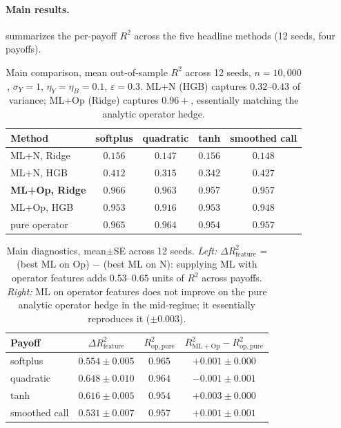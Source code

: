 \documentclass[11pt,reqno]{amsart}
\theoremstyle{plain}
\theoremstyle{definition}
\theoremstyle{remark}
\begin{document}
\paragraph{Main results.}
 summarizes the per-payoff $R^{2}$
across the five headline methods (12 seeds, four payoffs).

\begin{table}[ht]
\centering
\small
\begin{tabular}{lcccc}
\toprule
Method & softplus & quadratic & tanh & smoothed call \\
\midrule
ML+N, Ridge                & $0.156$ & $0.147$ & $0.156$ & $0.148$ \\
ML+N, HGB                  & $0.412$ & $0.315$ & $0.342$ & $0.427$ \\
\textbf{ML+Op, Ridge}      & $\mathbf{0.966}$ & $\mathbf{0.963}$ & $\mathbf{0.957}$ & $\mathbf{0.957}$ \\
ML+Op, HGB                 & $0.953$ & $0.916$ & $0.953$ & $0.948$ \\
pure operator              & $0.965$ & $0.964$ & $0.954$ & $0.957$ \\
\bottomrule
\end{tabular}
\caption{Main comparison, mean out-of-sample $R^{2}$ across 12
seeds, $n=10{,}000$, $\sigma_{Y}=1$, $\eta_{Y}=\eta_{B}=0.1$,
$\varepsilon=0.3$. ML+N (HGB) captures $0.32$--$0.43$ of
variance; ML+Op (Ridge) captures $0.96+$, essentially matching
the analytic operator hedge.}
\label{tab:main-results}
\end{table}

\begin{table}[ht]
\centering
\begin{tabular}{lccc}
\toprule
Payoff & $\Delta R^{2}_{\mathrm{feature}}$ & $R^{2}_{\mathrm{op,pure}}$ &
  $R^{2}_{\mathrm{ML+Op}}-R^{2}_{\mathrm{op,pure}}$ \\
\midrule
softplus      & $0.554 \pm 0.005$ & $0.965$ & $+0.001 \pm 0.000$ \\
quadratic     & $0.648 \pm 0.010$ & $0.964$ & $-0.001 \pm 0.001$ \\
tanh          & $0.616 \pm 0.005$ & $0.954$ & $+0.003 \pm 0.000$ \\
smoothed call & $0.531 \pm 0.007$ & $0.957$ & $+0.001 \pm 0.001$ \\
\bottomrule
\end{tabular}
\caption{Main diagnostics, mean$\pm$SE across 12 seeds.
\emph{Left:} $\Delta R^{2}_{\mathrm{feature}}$ = (best ML on
Op) $-$ (best ML on N): supplying ML with operator features
adds $0.53$--$0.65$ units of $R^{2}$ across payoffs.
\emph{Right:} ML on operator features does not improve on the
pure analytic operator hedge in the mid-regime; it essentially
reproduces it ($\pm 0.003$).}
\label{tab:delta-feature}
\end{table}
\end{document}
